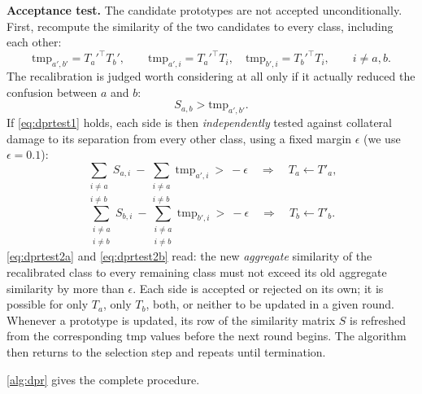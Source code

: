\documentclass{iutbscthesis}
\begin{document}
\textbf{Acceptance test.} The candidate prototypes are not accepted unconditionally. First, recompute the similarity of the two candidates to every class, including each other:
\begin{equation}
    \mathrm{tmp}_{a',b'} = T_a'^\top T_b', \qquad
    \mathrm{tmp}_{a',i} = T_a'^\top T_i,\quad
    \mathrm{tmp}_{b',i} = T_b'^\top T_i, \qquad i \ne a, b.
    \label{eq:dprtmp}
\end{equation}
The recalibration is judged worth considering at all only if it actually reduced the confusion between $a$ and $b$:
\begin{equation}
    S_{a,b} > \mathrm{tmp}_{a',b'}.
    \label{eq:dprtest1}
\end{equation}
If \autoref{eq:dprtest1} holds, each side is then \emph{independently} tested against collateral damage to its separation from every other class, using a fixed margin $\epsilon$ (we use $\epsilon = 0.1$):
\begin{equation}
    \sum_{\substack{i \ne a \\ i \ne b}} S_{a,i} \ - \sum_{\substack{i \ne a \\ i \ne b}} \mathrm{tmp}_{a',i} \ > \ -\epsilon
    \quad \Longrightarrow \quad T_a \leftarrow T'_a,
    \label{eq:dprtest2a}
\end{equation}
\begin{equation}
    \sum_{\substack{i \ne a \\ i \ne b}} S_{b,i} \ - \sum_{\substack{i \ne a \\ i \ne b}} \mathrm{tmp}_{b',i} \ > \ -\epsilon
    \quad \Longrightarrow \quad T_b \leftarrow T'_b .
    \label{eq:dprtest2b}
\end{equation}
\autoref{eq:dprtest2a} and \autoref{eq:dprtest2b} read: the new \emph{aggregate} similarity of the recalibrated class to every remaining class must not exceed its old aggregate similarity by more than $\epsilon$. Each side is accepted or rejected on its own; it is possible for only $T_a$, only $T_b$, both, or neither to be updated in a given round. Whenever a prototype is updated, its row of the similarity matrix $S$ is refreshed from the corresponding $\mathrm{tmp}$ values before the next round begins. The algorithm then returns to the selection step and repeats until termination.

\autoref{alg:dpr} gives the complete procedure.
\end{document}
